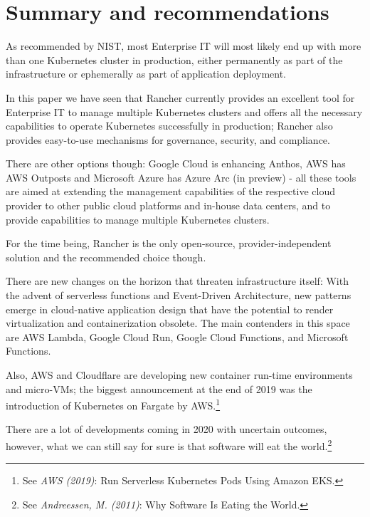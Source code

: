 %
%

\pagebreak
\section{Summary and recommendations}

\onehalfspacing

As recommended by NIST, most Enterprise IT will most likely end up with more than one Kubernetes cluster in production, either permanently as part of the infrastructure or ephemerally as part of application deployment.

In this paper we have seen that Rancher currently provides an excellent tool for Enterprise IT to manage multiple Kubernetes clusters and offers all the necessary capabilities to operate Kubernetes successfully in production; Rancher also provides easy-to-use mechanisms for governance, security, and compliance.

There are other options though: Google Cloud is enhancing Anthos, AWS has AWS Outposts and Microsoft Azure has Azure Arc (in preview) - all these tools are aimed at extending the management capabilities of the respective cloud provider to other public cloud platforms and in-house data centers, and to provide capabilities to manage multiple Kubernetes clusters.

For the time being, Rancher is the only open-source, provider-independent solution and the recommended choice though.

There are new changes on the horizon that threaten infrastructure itself: With the advent of serverless functions and Event-Driven Architecture, new patterns emerge in cloud-native application design that have the potential to render virtualization and containerization obsolete. The main contenders in this space are AWS Lambda, Google Cloud Run, Google Cloud Functions, and Microsoft Functions.

Also, AWS and Cloudflare are developing new container run-time environments and micro-VMs; the biggest announcement at the end of 2019 was the introduction of Kubernetes on Fargate by AWS.\footnote{See \textit{AWS (2019)}: Run Serverless Kubernetes Pods Using Amazon EKS.\cite{eksFargate}}

There are a lot of developments coming in 2020 with uncertain outcomes, however, what we can still say for sure is that software will eat the world.\footnote{See \textit{Andreessen, M. (2011)}: Why Software Is Eating the World.\cite{softwareEats}}
